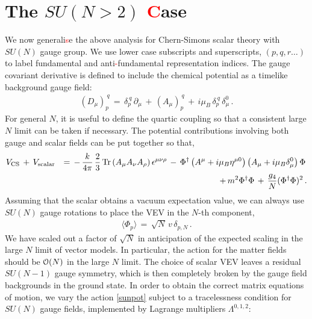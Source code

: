  \section{The $SU(N>2)$ \textcolor{red}{C}ase}
 \label{sec4}
 We now generali\textcolor{red}{s}e the above analysis for Chern-Simons scalar theory with $SU(N) $ gauge group. 
 We use lower case subscripts and superscripts, $(p,q,r\ldots)$ to label  fundamental and  anti\textcolor{red}{-}fundamental representation indices. The gauge covariant derivative is defined to include the chemical potential as a timelike background gauge field:
  \begin{eqnarray}
(D_{\mu})_{p}^{\ q}\,=\,\delta_{p}^{\ q}\,\partial_{\mu}\,+\,(A_{\mu})_{p}^{\ q}\,+\,i\mu_{B}\, \delta_{p}^{\ q}\,\delta_{\mu}^{0}\,. 
\end{eqnarray}
For general $N$, it is useful to define the quartic coupling so that a consistent large $N$ limit can be taken if necessary.  The potential contributions involving both gauge and scalar fields can be put together so that,
\begin{eqnarray}
V_{\rm CS}\,+\, V_{\rm scalar}&&=\, -\,\frac{k}{4\pi}\,\frac{2}{3}\,{\rm Tr}\left(A_\mu A_\nu A_\rho\right)\epsilon^{\mu\nu\rho}\,-\,
\Phi^{\dagger}\left(A^\mu + i\mu_B\eta^{\mu 0}\right)\left(A_\mu + i\mu_B\delta_{\mu}^0\right)\Phi\,\nonumber\\\label{sunpot}
&&%
+\,m^{2}\Phi^{\dagger}
\Phi\,+\,\frac{g_{4}}{N}(\Phi^{\dagger}\Phi)^{2}\,.
\end{eqnarray}
Assuming that the scalar obtains a vacuum expectation value, we can always use $SU(N)$ gauge rotations to place the VEV in the $N$-th component,
\begin{eqnarray}
\langle\Phi_{p}\rangle\,=\,\sqrt{N}\,v \,\delta_{p,N}\label{sclarvev}\,.
\end{eqnarray}
We have scaled out a factor of $\sqrt N$ in anticipation of the expected scaling in the  large $N$ limit of vector models. In particular, the action for the matter fields should be ${\cal O}(N)$ in the large $N$ limit.
The choice of scalar VEV leaves a residual $SU(N-1)$ gauge symmetry, which is then completely broken by the gauge field backgrounds in the ground state. In order to obtain the correct matrix equations of motion, we vary the action \eqref{sunpot} subject to a tracelessness condition for $SU(N)$ gauge fields, implemented by Lagrange multipliers $\Lambda^{0,1,2}$:
